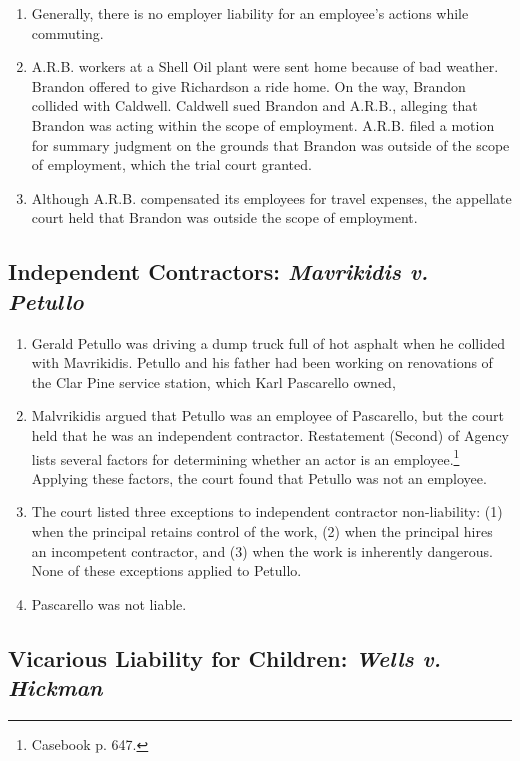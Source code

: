 \begin{enumerate}
    \item Generally, there is no employer liability for an employee's
    actions while commuting.
    \item A.R.B. workers at a Shell Oil plant were sent home because of bad 
    weather. Brandon offered to give Richardson a ride home. On the way, Brandon 
    collided with Caldwell. Caldwell sued Brandon and A.R.B., alleging that 
    Brandon was acting within the scope of employment. A.R.B. filed a motion for 
    summary judgment on the grounds that Brandon was outside of the scope of 
    employment, which the trial court granted.
    \item Although A.R.B. compensated its employees for travel expenses, the 
    appellate court held that Brandon was outside the scope of employment.
\end{enumerate}

\subsection{Independent Contractors: \emph{Mavrikidis v. Petullo}}

\begin{enumerate}
    \item Gerald Petullo was driving a dump truck full of hot asphalt when he 
    collided with Mavrikidis. Petullo and his father had been working on 
    renovations of the Clar Pine service station, which Karl Pascarello owned,
    \item Malvrikidis argued that Petullo was an employee of Pascarello, but the 
    court held that he was an independent contractor. Restatement (Second) of 
    Agency lists several factors for determining whether an actor is an 
    employee.\footnote{Casebook p. 647.} Applying these factors, the court found 
    that Petullo was not an employee.
    \item The court listed three exceptions to independent contractor 
    non-liability: (1) when the principal retains control of the work, (2) when 
    the principal hires an incompetent contractor, and (3) when the work is 
    inherently dangerous. None of these exceptions applied to Petullo.
    \item Pascarello was not liable.
\end{enumerate}

\subsection{Vicarious Liability for Children: \emph{Wells v. Hickman}}

